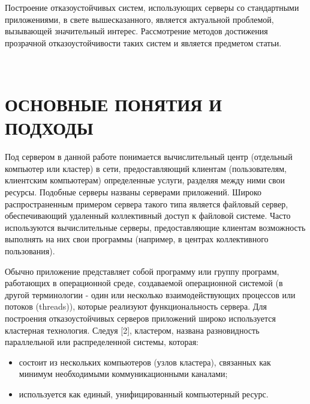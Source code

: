 \begin{multicols}{2}
Построение отказоустойчивых систем, использующих серверы со стандартными приложениями, в свете вышесказанного, является актуальной проблемой, вызывающей значительный интерес. Рассмотрение методов достижения прозрачной отказоустойчивости таких систем и является предметом статьи.
\begin{figure*} %
\vspace*{1pt}
\begin{center}
\mbox{%
\epsfxsize=1.6in
\epsfxsize=100mm
}
\end{center}
\vspace*{-9pt}
\vspace*{-3pt}
\end{figure*}


\section{ОСНОВНЫЕ ПОНЯТИЯ И ПОДХОДЫ}

Под сервером в данной работе понимается вычислительный центр
(отдельный компьютер или кластер) в сети, предоставляющий клиентам
(пользователям, клиентским компьютерам) определенные услуги, разделяя
между ними свои ресурсы. Подобные серверы названы серверами приложений.
Широко распространенным примером сервера такого типа является файловый сервер, обеспечивающий удаленный коллективный доступ к файловой системе. Часто используются вычислительные серверы, предоставляющие клиентам возможность выполнять на них свои программы (например, в центрах коллективного пользования).


Обычно приложение представляет собой программу или группу программ, работающих в операционной среде, создаваемой операционной системой (в другой терминологии - один или несколько взаимодействующих процессов или потоков (threads)), которые реализуют функциональность сервера. Для построения отказоустойчивых серверов приложений широко используется кластерная технология. Следуя [2], кластером, названа разновидность параллельной или распределенной системы, которая:
\begin{itemize}
\item состоит из нескольких компьютеров (узлов кластера), связанных как минимум необходимыми коммуникационными каналами;
\item используется как единый, унифицированный компьютерный ресурс.
\end{itemize}


\end{multicols}
